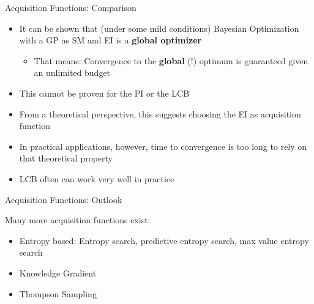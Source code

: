 \documentclass[11pt,compress,t,notes=noshow, xcolor=table]{beamer}
\begin{document}
\begin{vbframe}{Acquisition Functions: Comparison}

\begin{itemize}
  \item It can be shown that (under some mild conditions) Bayesian Optimization with a GP as SM and EI is a \textbf{global optimizer}
  \begin{itemize}
    \item That means: Convergence to the \textbf{global} (!) optimum is guaranteed given an unlimited budget
  \end{itemize}
  \item This cannot be proven for the PI or the LCB
  \item From a theoretical perspective, this suggests choosing the EI as acquisition function
  \item In practical applications, however, time to convergence is too long to rely on that theoretical property
  \item LCB often can work very well in practice
\end{itemize}

\end{vbframe}

\begin{vbframe}{Acquisition Functions: Outlook}

Many more acquisition functions exist:

\begin{itemize}
  \item Entropy based: Entropy search, predictive entropy search, max value entropy search
  \item Knowledge Gradient
  \item Thompson Sampling
\end{itemize}

\end{vbframe}


\endlecture
\end{document}
